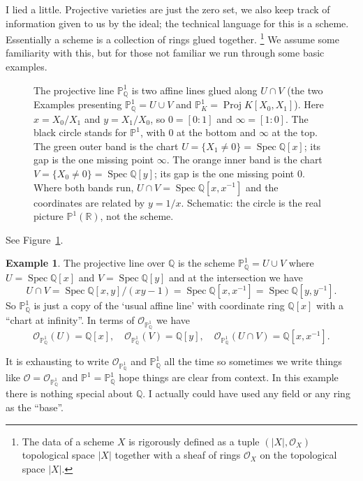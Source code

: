 \documentclass[12pt]{article}
\numberwithin{equation}{section}
\theoremstyle{definition}
\newtheorem{example}[theorem]{Example}
\theoremstyle{remark}
\newcommand{\QQ}{\mathbb{Q}}
\newcommand{\RR}{\mathbb{R}}
\newcommand{\Ocal}{\mathcal{O}}
\newcommand{\PP}{\mathbb{P}}
\newcommand{\Spec}{\operatorname{Spec}}
\newcommand{\Proj}{\operatorname{Proj}}
\begin{document}
I lied a little. Projective varieties are just the zero set, we also keep track of information given to us by the ideal; the technical language for this is a scheme. 
Essentially a scheme is a collection of rings glued together.
\footnote{The data of a scheme $X$ is rigorously defined as a tuple $(\vert X \vert, \Ocal_X)$ topological space $\vert X\vert$ together with a sheaf of rings $\Ocal_X$ on the topological space $\vert X \vert$.}
We assume some familiarity with this, but for those not familiar we run through some basic examples.

\begin{figure}[H]
\centering

\caption{The projective line $\PP^1_{\QQ}$ is two affine lines glued along $U\cap V$ (the two Examples presenting $\PP^1_{\QQ}=U\cup V$ and $\PP^1_K=\Proj K[X_0,X_1]$). Here $x=X_0/X_1$ and $y=X_1/X_0$, so $0=[0{:}1]$ and $\infty=[1{:}0]$. The black circle stands for $\PP^1$, with $0$ at the bottom and $\infty$ at the top. The green outer band is the chart $U=\{X_1\neq0\}=\Spec\QQ[x]$; its gap is the one missing point $\infty$. The orange inner band is the chart $V=\{X_0\neq0\}=\Spec\QQ[y]$; its gap is the one missing point $0$. Where both bands run, $U\cap V=\Spec\QQ[x,x^{-1}]$ and the coordinates are related by $y=1/x$. Schematic: the circle is the real picture $\PP^1(\RR)$, not the scheme.}\label{fig:p1-two-charts}
\end{figure}
See Figure~\ref{fig:p1-two-charts}.

\begin{example}
	The projective line over $\QQ$ is the scheme
	$\PP^1_{\QQ}=U \cup V$ where $U = \Spec \QQ[x]$ and $V = \Spec \QQ[y]$ and at the intersection we have 
	$$ U\cap V = \Spec \QQ[x,y]/(xy-1) = \Spec \QQ[x,x^{-1}] = \Spec \QQ[y,y^{-1}].$$
	So $\PP^1_{\QQ}$ is just a copy of the `usual affine line' with coordinate ring $\QQ[x]$
	with a ``chart at infinity''.
	In terms of $\Ocal_{\PP^1_{\QQ}}$ we have 
	$$\Ocal_{\PP^1_{\QQ}}(U) =\QQ[x], \quad \Ocal_{\PP^1_{\QQ}}(V) = \QQ[y], \quad \Ocal_{\PP^1_{\QQ}}(U\cap V) = \QQ[x,x^{-1}].$$
\end{example}
	It is exhausting to write $\Ocal_{\PP^1_{\QQ}}$ and $\PP^1_{\QQ}$ all the time so sometimes we write things like $\Ocal = \Ocal_{\PP^1_{\QQ}}$ and $\PP^1=\PP^1_{\QQ}$ hope things are clear from context. 
	In this example there is nothing special about $\QQ$. 
	I actually could have used any field or any ring as the ``base''.
	
\end{document}
